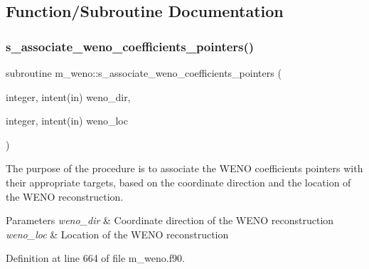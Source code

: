 \subsection{Function/\+Subroutine Documentation}
\mbox{\label{namespacem__weno_adcb329b727281d1855405733054b996e}} 
\subsubsection{\texorpdfstring{s\+\_\+associate\+\_\+weno\+\_\+coefficients\+\_\+pointers()}{s\_associate\_weno\_coefficients\_pointers()}}
{\footnotesize\ttfamily subroutine m\+\_\+weno\+::s\+\_\+associate\+\_\+weno\+\_\+coefficients\+\_\+pointers (\begin{DoxyParamCaption}\item[{integer, intent(in)}]{weno\+\_\+dir,  }\item[{integer, intent(in)}]{weno\+\_\+loc }\end{DoxyParamCaption})}



The purpose of the procedure is to associate the W\+E\+NO coefficients\textquotesingle{} pointers with their appropriate targets, based on the coordinate direction and the location of the W\+E\+NO reconstruction. 


\begin{DoxyParams}{Parameters}
{\em weno\+\_\+dir} & Coordinate direction of the W\+E\+NO reconstruction \\
\hline
{\em weno\+\_\+loc} & Location of the W\+E\+NO reconstruction \\
\hline
\end{DoxyParams}


Definition at line 664 of file m\+\_\+weno.\+f90.

\mbox{\label{namespacem__weno_ac16dc64bea94d533366e3462ddb351a6}} 

